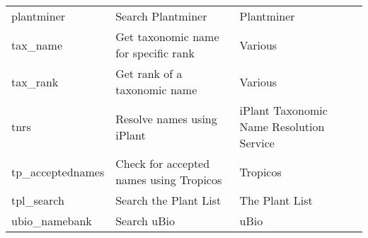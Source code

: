 \documentclass[10pt]{article}\usepackage[]{graphicx}\usepackage[]{color}
\begin{document}
\begin{table}[!ht]
\begin{tabular}{|l|L|L|}
plantminer & Search Plantminer & Plantminer \cite{carvalho2010plantminer}   \\
tax\_name & Get taxonomic name for specific rank & Various  \\
tax\_rank & Get rank of a taxonomic name & Various  \\
tnrs & Resolve names using iPlant & iPlant Taxonomic Name Resolution Service \cite{tnrs}  \\
tp\_acceptednames & Check for accepted names using Tropicos & Tropicos \cite{tropicos}  \\
tpl\_search & Search the Plant List & The Plant List \cite{theplantlist}  \\
ubio\_namebank & Search uBio & uBio \cite{ubio}  \\
\hline
\end{tabular}
\label{tab:a}
\end{table}
\end{document}
